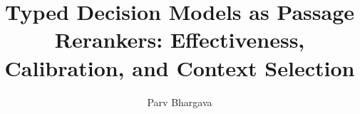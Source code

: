 \documentclass[sigconf,nonacm]{acmart}
\begin{document}
\title{Typed Decision Models as Passage Rerankers: Effectiveness, Calibration, and Context Selection}

\author{Parv Bhargava}

\begin{abstract}

\end{abstract}


\maketitle












\appendix

\end{document}
